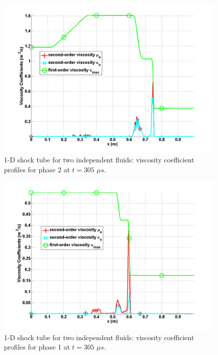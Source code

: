 \begin{figure}[H]
\centering
\includegraphics[width=\textwidth]{figures/SEM/two_phases_liquid_viscosity_kappa_mu.png}
\caption{1-D shock tube for two independent fluids: viscosity coefficient profiles for phase $2$ at $t=305$ $\mu s$.}
\label{fig:two-indep-fluids-visc-2-7-eqn-sect4}
\end{figure}
%
\begin{figure}[H]
\centering
\includegraphics[width=\textwidth]{figures/SEM/two_phases_vapor_viscosity_kappa_mu.png}
\caption{1-D shock tube for two independent fluids: viscosity coefficient profiles for phase 1 at $t=305$ $\mu s$.}
\label{fig:two-indep-fluids-visc-1-7-eqn-sect4}
\end{figure}
%
